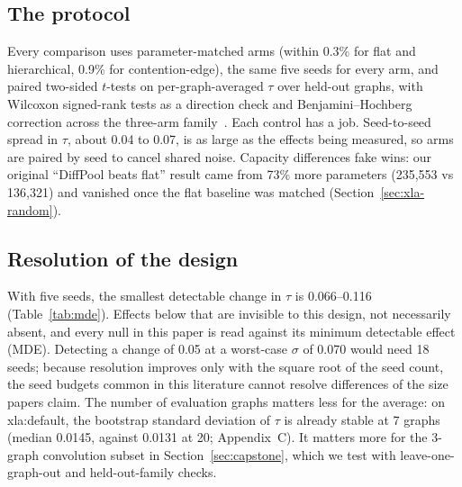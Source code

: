 \subsection{The protocol}
\label{sec:protocol}
Every comparison uses parameter-matched arms (within 0.3\% for flat and hierarchical, 0.9\% for
contention-edge), the same five seeds for every arm, and paired two-sided $t$-tests on
per-graph-averaged $\tau$ over held-out graphs, with Wilcoxon signed-rank tests as a direction check
and Benjamini--Hochberg correction across the three-arm family~\cite{benjamini1995controlling}. Each
control has a job. Seed-to-seed spread in $\tau$, about 0.04 to 0.07, is as large as the effects being
measured, so arms are paired by seed to cancel shared noise. Capacity differences fake wins: our
original ``DiffPool beats flat'' result came from 73\% more parameters (235,553 vs 136,321) and
vanished once the flat baseline was matched (Section~\ref{sec:xla-random}).

\subsection{Resolution of the design}
\label{sec:resolution}
With five seeds, the smallest detectable change in $\tau$ is 0.066--0.116 (Table~\ref{tab:mde}).
Effects below that are invisible to this design, not necessarily absent, and every null in this paper
is read against its minimum detectable effect (MDE). Detecting a change of 0.05 at a worst-case
$\sigma$ of 0.070 would need 18 seeds; because resolution improves only with the square root of the
seed count, the seed budgets common in this literature cannot resolve differences of the size papers
claim. The number of evaluation graphs matters less for the average: on xla:default, the bootstrap
standard deviation of $\tau$ is already stable at 7 graphs (median 0.0145, against 0.0131 at 20;
Appendix~C). It matters more for the 3-graph convolution subset in Section~\ref{sec:capstone}, which
we test with leave-one-graph-out and held-out-family checks.

\begin{table}[t]
\caption{Minimum detectable change in Kendall's $\tau$ (paired $t$-test, $\alpha = 0.05$, power 0.8)
by number of seeds $n$ and seed-to-seed standard deviation $\sigma$ of $\Delta\tau$.}
\label{tab:mde}
\centering
\small
\setlength{\tabcolsep}{4pt}

\end{table}


